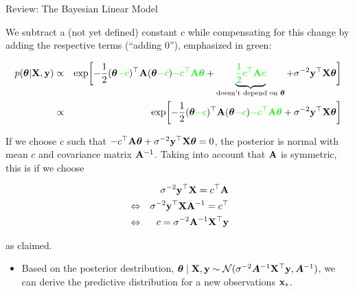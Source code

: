 \begin{frame}[c, allowframebreaks]{Review: The Bayesian Linear Model}
\begin{footnotesize}
\vspace{+.2cm}

We subtract a (not yet defined) constant $c$ while compensating for this change by adding the respective terms (``adding $0$''), emphasized in green:

\vspace{-.5cm}

\begin{eqnarray*}
	p(\bm{\theta} | \mathbf{X}, \mathbf{y}) &\propto&  \exp\biggl[-\frac{1}{2}(\bm{\theta} \textcolor{green}{- c})^\top\mathbf{A}  (\bm{\theta} \textcolor{green}{- c}) \textcolor{green}{- c^\top \mathbf{A} \bm{\theta}} + \underbrace{\textcolor{green}{\frac{1}{2}c^\top\mathbf{A} c}}_{\text{doesn't depend on } \bm{\theta}} +\sigma^{-2} \mathbf{y}^\top \mathbf{X} \bm{\theta}\biggr] \\
	&\propto& \exp\biggl[-\frac{1}{2}(\bm{\theta} \textcolor{green}{- c})^\top\mathbf{A}  (\bm{\theta} \textcolor{green}{- c}) \textcolor{green}{- c^\top \mathbf{A} \bm{\theta}} +\sigma^{-2} \mathbf{y}^\top \mathbf{X} \bm{\theta}\biggr]
\end{eqnarray*}

If we choose $c$ such that $- c^\top \mathbf{A} \bm{\theta} +\sigma^{-2} \mathbf{y}^\top \mathbf{X} \bm{\theta} = 0$, the posterior is normal with mean $c$ and covariance matrix $\mathbf{A}^{-1}$. Taking into account that $\mathbf{A}$ is symmetric, this is if we choose

\vspace{-.5cm}

\begin{eqnarray*}
&& \sigma^{-2} \mathbf{y}^\top \mathbf{X} = c^\top\mathbf{A} \\
&\Leftrightarrow & \sigma^{-2} \mathbf{y}^\top \mathbf{X} \mathbf{A}^{-1} = c^\top \\
&\Leftrightarrow& c = \sigma^{-2} \mathbf{A}^{-1} \mathbf{X}^\top \mathbf{y}
\end{eqnarray*}

\vspace{-.3cm}

as claimed.

\end{footnotesize}

\framebreak

\begin{itemize}

\item Based on the posterior destribution, 
$\bm{\theta} \mid \mathbf{X}, \mathbf{y} \sim \mathcal{N}(\sigma^{-2}\bm{A}^{-1}\mathbf{X}^\top\mathbf{y}, \bm{A}^{-1})$,
we can derive the predictive distribution for a new observations $\mathbf{x}_*$.


\end{itemize}
\end{frame}

